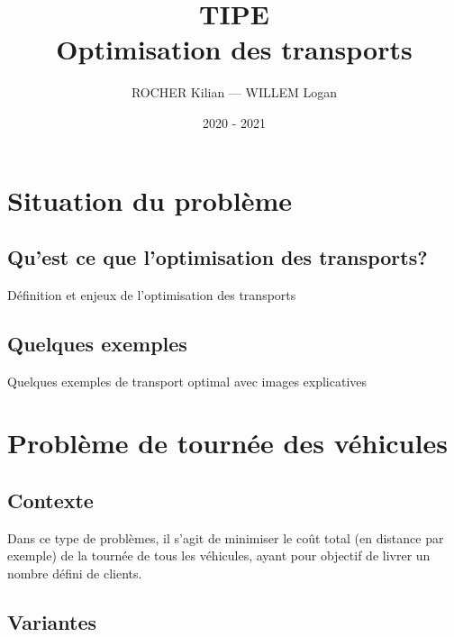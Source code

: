 \documentclass[10pt]{beamer}
\title[TIPE — Optimisation des transports]{TIPE \\ Optimisation des transports}
\author{ROCHER Kilian — WILLEM Logan}
\date{2020 - 2021}
\begin{document}
	\begin{frame}[plain]
		\maketitle
	\end{frame}

	\begin{frame}[plain]
		\tableofcontents
	\end{frame}

	\section{Situation du problème}
	
	\subsection{Qu'est ce que l'optimisation des transports?}
	
	\begin{frame}
		Définition et enjeux de l'optimisation des transports
	\end{frame}
	
	\subsection{Quelques exemples}
	
	\begin{frame}
		Quelques exemples de transport optimal avec images explicatives
	\end{frame}
	
	\section{Problème de tournée des véhicules}
	
	\subsection{Contexte}
	
	\begin{frame}
		Dans ce type de problèmes, il s'agit de minimiser le coût total (en distance par exemple) de la tournée de tous les véhicules, ayant pour objectif de livrer un nombre défini de clients.
	\end{frame}

	\subsection{Variantes}
	
\end{document}
